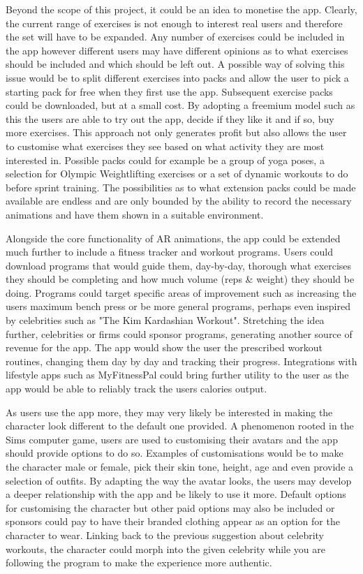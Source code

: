 \documentclass{l4proj}
\begin{document}
Beyond the scope of this project, it could be an idea to monetise the app. Clearly, the current range of exercises is not enough to interest real users and therefore the set will have to be expanded. Any number of exercises could be included in the app however different users may have different opinions as to what exercises should be included and which should be left out. A possible way of solving this issue would be to split different exercises into packs and allow the user to pick a starting pack for free when they first use the app. Subsequent exercise packs could be downloaded, but at a small cost. By adopting a freemium model such as this the users are able to try out the app, decide if they like it and if so, buy more exercises. This approach not only generates profit but also allows the user to customise what exercises they see based on what activity they are most interested in. Possible packs could for example be a group of yoga poses, a selection for Olympic Weightlifting exercises or a set of dynamic workouts to do before sprint training. The possibilities as to what extension packs could be made available are endless and are only bounded by the ability to record the necessary animations and have them shown in a suitable environment. 


Alongside the core functionality of AR animations, the app could be extended much further to include a fitness tracker and workout programs. Users could download programs that would guide them, day-by-day, thorough what exercises they should be completing and how much volume (reps \& weight) they should be doing. Programs could target specific areas of improvement such as increasing the users maximum bench press or be more general programs, perhaps even inspired by celebrities such as "The Kim Kardashian Workout". Stretching the idea further, celebrities or firms could sponsor programs, generating another source of revenue for the app. The app would show the user the prescribed workout routines, changing them day by day and tracking their progress. Integrations with lifestyle apps such as MyFitnessPal could bring further utility to the user as the app would be able to reliably track the users calories output. 

As users use the app more, they may very likely be interested in making the character look different to the default one provided. A phenomenon rooted in the Sims computer game, users are used to customising their avatars and the app should provide options to do so. Examples of customisations would be to make the character male or female, pick their skin tone, height, age and even provide a selection of outfits. By adapting the way the avatar looks, the users may develop a deeper relationship with the app and be likely to use it more. Default options for customising the character but other paid options may also be included or sponsors could pay to have their branded clothing appear as an option for the character to wear. Linking back to the previous suggestion about celebrity workouts, the character could morph into the given celebrity while you are following the program to make the experience more authentic. 
\end{document}
